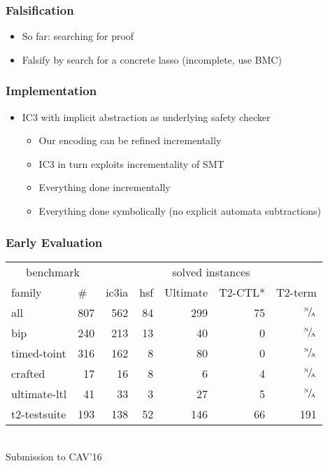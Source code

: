 \documentclass[d3s,tikz]{beamer}
\begin{document}
\subtitleframe{}
\begin{frame}
\frametitle{Falsification}
\begin{itemize}
\item So far: searching for proof
\item Falsify by search for a concrete lasso (incomplete, use BMC)
\end{itemize}
\end{frame}
\subtitleframe{}
\begin{frame}
\frametitle{Implementation}
\begin{itemize}
\item IC3 with implicit abstraction as underlying safety checker
\begin{itemize}
\item Our encoding can be refined incrementally
\item IC3 in turn exploits incrementality of SMT
\item Everything done incrementally
\item Everything done symbolically (no explicit automata subtractions)
\end{itemize}
\end{itemize}
\end{frame}
\subtitleframe{}
\begin{frame}
\frametitle{Early Evaluation}
\centering
\def\us{\cellcolor{blue!100}}
\def\na{\color{darkgray}$^\text{\tiny N}\!/\!_\text{\tiny A}$}
\def\sum{\cellcolor{gray}}
\begin{tabular}{lr | r r r r r}
\multicolumn{2}{c|}{benchmark} & \multicolumn{5}{c}{solved instances} \\
\multicolumn{1}{l}{family} & \multicolumn{1}{l|}{\#} & \multicolumn{1}{l}{\us ic3ia} & \multicolumn{1}{l}{hsf} & \multicolumn{1}{l}{Ultimate} & \multicolumn{1}{l}{T2-CTL*} & \multicolumn{1}{l}{T2-term} \\
\sum all & \sum 807 & \us 562 & \sum 84 & \sum 299 & \sum 75 & \sum \na \\
bip          & 240 & \us 213 & 13 &  40 &  0 & \na \\
timed-toint  & 316 & \us 162 &  8 &  80 &  0 & \na \\
crafted      &  17 & \us  16 &  8 &   6 &  4 & \na \\
ultimate-ltl &  41 & \us  33 &  3 &  27 &  5 & \na \\
t2-testsuite & 193 & \us 138 & 52 & 146 & 66 & 191 \\
\end{tabular} \\
\vskip1cm
Submission to CAV'16
\end{frame}
\end{document}
